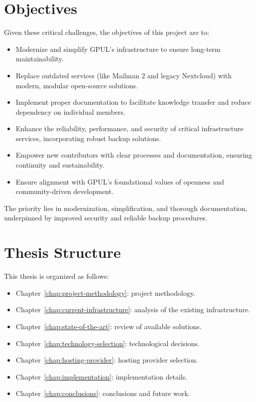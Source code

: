 \section{Objectives}

Given these critical challenges, the objectives of this project are to:

\begin{itemize}
    \item Modernize and simplify GPUL's infrastructure to ensure long-term maintainability.
    \item Replace outdated services (like Mailman 2 and legacy Nextcloud) with modern, modular open-source solutions.
    \item Implement proper documentation to facilitate knowledge transfer and reduce dependency on individual members.
    \item Enhance the reliability, performance, and security of critical infrastructure services, incorporating robust backup solutions.
    \item Empower new contributors with clear processes and documentation, ensuring continuity and sustainability.
    \item Ensure alignment with GPUL's foundational values of openness and community-driven development.
\end{itemize}

The priority lies in modernization, simplification, and thorough documentation, underpinned by improved security and reliable backup procedures.

\section{Thesis Structure}

This thesis is organized as follows:
\begin{itemize}
    \item Chapter~\ref{chap:project-methodology}: project methodology.
    \item Chapter~\ref{chap:current-infrastructure}: analysis of the existing infrastructure.
    \item Chapter~\ref{chap:state-of-the-art}: review of available solutions.
    \item Chapter~\ref{chap:technology-selection}: technological decisions.
    \item Chapter~\ref{chap:hosting-provider}: hosting provider selection.
    \item Chapter~\ref{chap:implementation}: implementation details.
    \item Chapter~\ref{chap:conclusions}: conclusions and future work.
\end{itemize}
